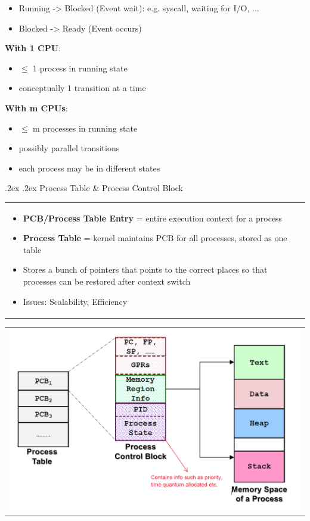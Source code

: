 \documentclass[13pt,landscape,a4paper]{article}
\makeatletter
\renewcommand{\subsection}{\@startsection{subsection}{1}{0mm}%
    {.2ex}%
    {.2ex}%
    {\sffamily\bfseries}}
\makeatother
\begin{document}
\begin{multicols*}{3}
\begin{itemize}
            \item Running -> Blocked (Event wait): e.g. syscall, waiting for I/O, ...
            \item Blocked -> Ready (Event occurs)
        \end{itemize}
        \textbf{With 1 CPU}:
        \begin{itemize}
            \item $\leq$ 1 process in running state
            \item conceptually 1 transition at a time
        \end{itemize}
        \textbf{With m CPUs}:
        \begin{itemize}
            \item $\leq$ m processes in running state
            \item possibly parallel transitions
            \item each process may be in different states
        \end{itemize}
        \subsection{Process Table \& Process Control Block}
        \begin{tabularx}{0.42\columnwidth}{X}
            \begin{itemize}
                \item \textbf{PCB/Process Table Entry} = entire execution context for a process
                \item \textbf{Process Table} =  kernel maintains PCB for all processes, stored as one table
                \item Stores a bunch of pointers that points to the correct places so that processes can be restored after context switch
                \item Issues: Scalability, Efficiency
            \end{itemize}
        \end{tabularx}
        \begin{tabular}{l}
            \includegraphics[width=0.55\linewidth]{process-table}
        \end{tabular}

\end{multicols*}
\end{document}
